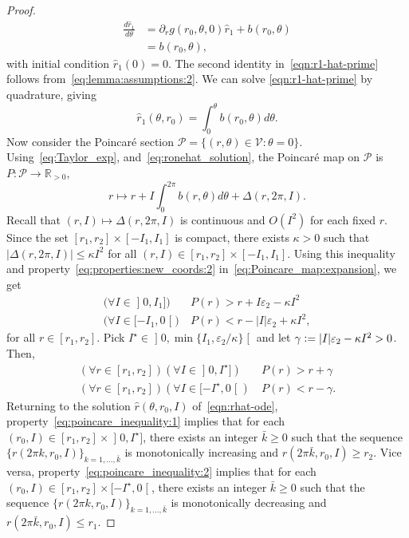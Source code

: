 \documentclass[journal,twoside,web, twocolumn]{ieeecolor}
\renewcommand*{\Re}{\mathbb{R}}
\newcommand*{\cV}{\mathcal{V}}
\newcommand*{\cP}{\mathcal{P}}
\newcommand*{\eqdef}{\vcentcolon=}
\begin{document}
\begin{proof}
    \begin{equation}\label{eqn:r1-hat-prime}
\begin{aligned}         
\frac{d \hat{r}_1}{d \theta}&=
        \partial_{r} g(r_0,\theta,0)\hat{r}_1 +
        b(r_0,\theta) \\
&=b(r_0,\theta),
\end{aligned}
     \end{equation}
with initial condition $\hat r_1(0)=0$. The second identity in~\eqref{eqn:r1-hat-prime} follows from~\eqref{eq:lemma:assumptions:2}. We can solve \eqref{eqn:r1-hat-prime} by quadrature, giving
\begin{equation}
\label{eq:ronehat_solution}
\hat{r}_1(\theta,r_0) = \int_0^\theta b(r_0,\theta)d\theta.
\end{equation}
Now consider the Poincar\'e section $\cP = \{(r,\theta) \in \cV: \theta =0\}$. Using~\eqref{eq:Taylor_exp},
and~\eqref{eq:ronehat_solution}, the Poincar\'e map on $\cP$ is $P: \cP \to
\Re_{>0}$, 
\begin{equation}\label{eq:Poincare_map:expansion}
r \mapsto r + I \int_0^{2\pi} b(r,\theta) d \theta + \Delta(r,2 \pi,I).
\end{equation}
Recall that $(r,I) \mapsto \Delta(r,2 \pi,I)$ is continuous and $O(I^2)$ for each fixed $r$. Since the set $[r_1,r_2] \times [-I_1,I_1]$ is compact, there exists $\kappa>0$ such that $| \Delta(r,2\pi,I)| \leq \kappa I^2$ for all  $(r,I) \in [r_1,r_2] \times [-I_1,I_1]$. 
Using this inequality and property~\eqref{eq:properties:new_coords:2} in~\eqref{eq:Poincare_map:expansion}, we get
\[
\begin{aligned}
\big(\forall I \in \mathopen]0,I_1]\big) & \ P(r) > r + I \varepsilon_2 - \kappa I^2 \\
\big(\forall I \in [-I_1,0\mathclose[\big) & \ P(r) < r - |I| \varepsilon_2 + \kappa I^2,
\end{aligned}
\]
for all $r \in [r_1,r_2]$. Pick $I^\star \in \mathopen]0, \min\{I_1, \varepsilon_2/\kappa\} \mathclose[$ and let $\gamma \eqdef |I|\varepsilon_2 - \kappa I^2>0$. Then, 
\begin{subequations}\label{eq:poincare_inequality}
\begin{align}
(\forall r \in [r_1,r_2]) (\forall I \in \mathopen]0,I^\star]) & \ P(r) > r + \gamma \label{eq:poincare_inequality:1}\\
(\forall r \in [r_1,r_2]) (\forall I \in [-I^\star,0\mathclose[) & \ P(r) < r - \gamma. \label{eq:poincare_inequality:2}
\end{align}
\end{subequations}
Returning to the solution $\hat r(\theta,r_0,I)$ of~\eqref{eqn:rhat-ode}, property~\eqref{eq:poincare_inequality:1} implies that for each $(r_0,I) \in [r_1,r_2] \times \mathopen]0,I^\star]$, there exists an integer $\bar k \geq 0$ such that the sequence $\{r(2 \pi k, r_0,I)\}_{k =1,\ldots,\bar k}$ is monotonically increasing and $r(2 \pi \bar k,r_0,I) \geq r_2$. Vice versa, property~\eqref{eq:poincare_inequality:2} implies that for each $(r_0,I) \in [r_1,r_2] \times [-I^\star,0\mathclose[$, there exists an integer $\bar k \geq 0$ such that the sequence $\{r(2 \pi k, r_0,I)\}_{k =1,\ldots,\bar k}$ is monotonically decreasing and $r(2 \pi \bar k,r_0,I) \leq r_1$.


\end{proof}
\end{document}
